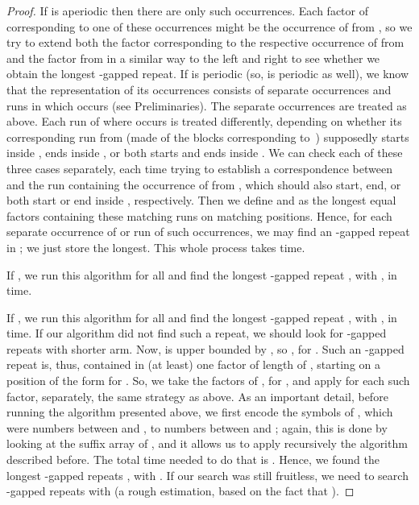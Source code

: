 \documentclass[final]{dmtcs-episciences}
\begin{document}
\begin{proof}
If  is aperiodic then there are only  such occurrences. Each factor of  corresponding to one of these occurrences might be the occurrence of  from , so we try to extend both the factor corresponding to the respective occurrence of  from  and the factor  from  in a similar way to the left and right to see whether we obtain the longest -gapped repeat. If  is periodic (so,  is periodic as well), we know that the representation of its occurrences consists of  separate occurrences and  runs in which  occurs (see Preliminaries). The separate occurrences are treated as above. Each run  of  where  occurs is treated differently, depending on whether its corresponding run  from  (made of the blocks corresponding to~) supposedly starts inside , ends inside , or both starts and ends inside . We can check each of these three cases separately, each time trying to establish a correspondence between  and the run containing the occurrence of  from , which should also start, end, or both start or end inside , respectively. Then we define  and  as the longest equal factors containing these matching runs on matching positions. Hence, for each separate occurrence of  or run of such occurrences, we may find an -gapped repeat in ; we just store the longest. This whole process takes  time.

If , we run this algorithm for all  and find the longest -gapped repeat , with , in  time. 

If , we run this algorithm for all  and find the longest -gapped repeat , with , in  time.  If our algorithm did not find such a repeat, we should look for -gapped repeats with shorter arm. Now,  is upper bounded by , so , for . Such an -gapped repeat  is, thus, contained in (at least) one factor of length  of , starting on a position of the form  for .  So, we take the factors  of , for , and apply for each such factor, separately, the same strategy as above. As an important detail, before running the algorithm presented above, we first encode the symbols of , which were numbers between  and , to numbers between  and ; again, this is done by looking at the suffix array of , and it allows us to apply recursively the algorithm described before. The total time needed to do that is . Hence, we found the longest -gapped repeats , with . If our search was still fruitless, we need to search -gapped repeats with  (a rough estimation, based on the fact that ). 


\end{proof}
\end{document}
